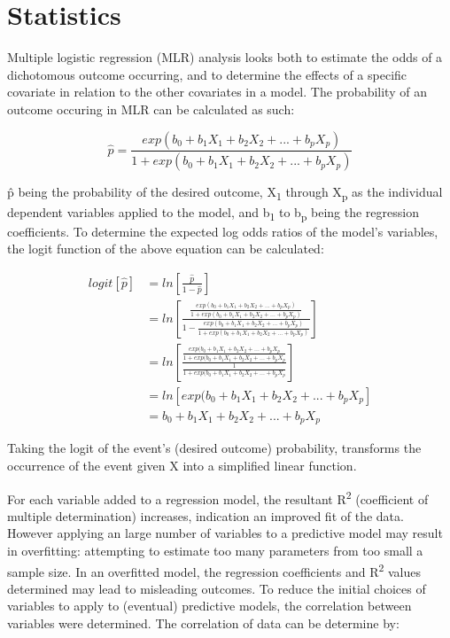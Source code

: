 \cleartooddpage[\thispagestyle{empty}]
\chapter{Statistics}\label{APPENDIXA}

Multiple logistic regression (MLR) analysis looks both to estimate the odds of a dichotomous outcome occurring, and to determine the effects of a specific covariate in relation to the other covariates in a model. The probability of an outcome occuring in MLR can be calculated as such:

\begin{equation}
\hat{p} = \frac{exp(b_0 + b_1 X_1 + b_2 X_2 + ... + b_p X_p)}{1 + exp(b_0 + b_1 X_1 + b_2 X_2 + ... + b_p X_p)}
\end{equation}

\^{p} being the probability of the desired outcome, X\textsubscript{1} through X\textsubscript{p} as the individual dependent variables applied to the model, and b\textsubscript{1} to b\textsubscript{p} being the regression coefficients. 
To determine the expected log odds ratios of the model's variables, the logit function of the above equation can be calculated:

\begin{equation}
\begin{aligned}
logit[\hat{p}] & = ln[\frac{\hat{p}}{1-\hat{p}}] \\
			   & = ln\left[\frac{\frac{exp(b_0 + b_1 X_1 + b_2 X_2 + ... + b_p X_p)}{1 + exp(b_0 + b_1 X_1 + b_2 X_2 + ... + b_p X_p)}}{1 - \frac{exp(b_0 + b_1 X_1 + b_2 X_2 + ... + b_p X_p)}{1 + exp(b_0 + b_1 X_1 + b_2 X_2 + ... + b_p X_p)}}\right] \\
			   & = ln\left[\frac{\frac{exp(b_0 + b_1 X_1 + b_2 X_2 + ... + b_p X_p}{1 + exp(b_0 + b_1 X_1 + b_2 X_2 + ... + b_p X_p}}{\frac{1}{1 + exp(b_0 + b_1 X_1 + b_2 X_2 + ... + b_p X_p}}\right] \\
			   & = ln [ exp(b_0 + b_1 X_1 + b_2 X_2 + ... + b_p X_p] \\ 
			   & = b_0 + b_1 X_1 + b_2 X_2 + ... + b_p X_p
\end{aligned}
\end{equation}

Taking the logit of the event's (desired outcome) probability, transforms the occurrence of the event given X into a simplified linear function.

For each variable added to a regression model, the resultant R\textsuperscript{2} (coefficient of multiple determination) increases, indication an improved fit of the data. However applying an large number of variables to a predictive model may result in overfitting: attempting to estimate too many parameters from too small a sample size. In an overfitted model, the regression coefficients and R\textsuperscript{2} values determined may lead to misleading outcomes. To reduce the initial choices of variables to apply to (eventual) predictive models, the correlation between variables were determined. The correlation of data can be determine by:

